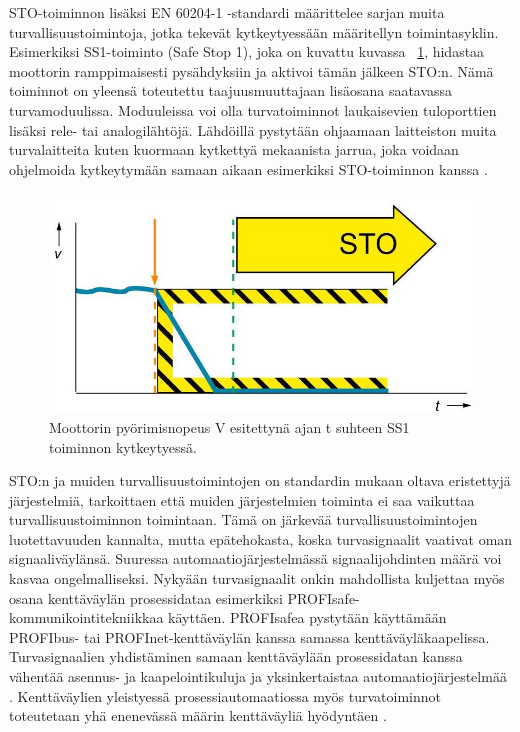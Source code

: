 \documentclass[finnish,12pt,a4paper,pdftex,elec,utf8]{aaltothesis}
\begin{document}
\noindent
STO-toiminnon lisäksi EN 60204-1 -standardi määrittelee sarjan muita turvallisuustoimintoja, jotka tekevät kytkeytyessään määritellyn toimintasyklin. Esimerkiksi SS1-toiminto (Safe Stop 1), joka on kuvattu kuvassa ~\ref{fig:SS1}, hidastaa moottorin ramppimaisesti pysähdyksiin ja aktivoi tämän jälkeen STO:n. Nämä toiminnot on yleensä toteutettu taajuusmuuttajaan lisäosana saatavassa turvamoduulissa. Moduuleissa voi olla turvatoiminnot laukaisevien tuloporttien lisäksi rele- tai analogilähtöjä. Lähdöillä pystytään ohjaamaan laitteiston muita turvalaitteita kuten kuormaan kytkettyä mekaanista jarrua, joka voidaan ohjelmoida kytkeytymään samaan aikaan esimerkiksi STO-toiminnon kanssa \cite{FSO}.

\begin{figure}[H]
	\begin{center}
	\includegraphics[scale=0.5]{SS1}
	\end{center}
	\caption{Moottorin pyörimisnopeus V esitettynä ajan t suhteen SS1 toiminnon kytkeytyessä.
		 \cite{SS1kuva}}
	\label{fig:SS1}
\end{figure}

\noindent
STO:n ja muiden turvallisuustoimintojen on standardin mukaan oltava eristettyjä järjestelmiä, tarkoittaen että muiden järjestelmien toiminta ei saa vaikuttaa turvallisuustoiminnon toimintaan. Tämä on järkevää turvallisuustoimintojen luotettavuuden kannalta, mutta epätehokasta, koska turvasignaalit vaativat oman signaaliväylänsä. Suuressa automaatiojärjestelmässä signaalijohdinten määrä voi kasvaa ongelmalliseksi. Nykyään turvasignaalit onkin mahdollista kuljettaa myös osana kenttäväylän prosessidataa esimerkiksi PROFIsafe-kommunikointitekniikkaa käyttäen. PROFIsafea pystytään käyttämään PROFIbus- tai PROFInet-kenttäväylän kanssa samassa kenttäväyläkaapelissa. Turvasignaalien yhdistäminen samaan kenttäväylään prosessidatan kanssa vähentää asennus- ja kaapelointikuluja ja yksinkertaistaa automaatiojärjestelmää \cite{MyyntiHaastattelu}. Kenttäväylien yleistyessä prosessiautomaatiossa myös turvatoiminnot toteutetaan yhä enenevässä määrin kenttäväyliä hyödyntäen \cite{Profisafe}.
\\\\
\end{document}

